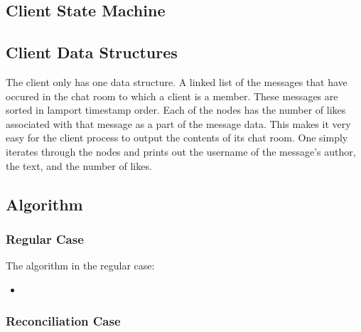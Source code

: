 \documentclass[12pt,journal,compsoc]{IEEEtran}
\begin{document}
\newpage
\subsection{Client State Machine}

\subsection{Client Data Structures}
The client only has one data structure. A linked list of the messages that have occured in the chat room to which a client is a member. These messages are sorted in lamport timestamp order. Each of the nodes has the number of likes associated with that message as a part of the message data. This makes it very easy for the client process to output the contents of its chat room. One simply iterates through the nodes and prints out the username of the message's author, the text, and the number of likes.

\subsection{Algorithm}

\subsubsection{Regular Case}

The algorithm in the regular case:
\begin{itemize}
\item 
\end{itemize}

\subsubsection{Reconciliation Case}
\end{document}

